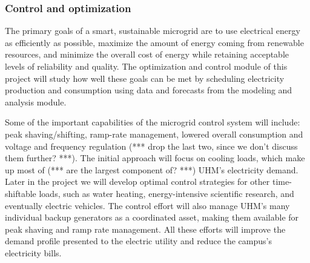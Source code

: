 
\subsubsection{Control and optimization}

The primary goals of a smart, sustainable microgrid are to use electrical
energy as efficiently as possible, maximize the amount of energy coming
from renewable resources, and minimize the overall cost of energy while
retaining acceptable levels of reliability and quality. The optimization
and control module of this project will study how well
these goals can be met by scheduling electricity production and consumption
using data and forecasts from the modeling and analysis module.

Some of the important capabilities of the microgrid control system will include: 
peak shaving/shifting, ramp-rate management, lowered overall consumption
and voltage and frequency regulation (*** drop the last two, since we don't discuss 
them further? ***). The initial approach will focus on cooling loads, which make up 
most of (*** are the largest component of? ***) UHM's electricity demand. 
Later in the project we will develop optimal control strategies for other 
time-shiftable loads, such as water heating, energy-intensive scientific research, 
and eventually electric vehicles. The control effort will also manage UHM's many 
individual backup generators as a coordinated asset, making them available for 
peak shaving and ramp rate management. All these efforts will improve the demand 
profile presented to the electric utility and reduce the campus's electricity bills.

